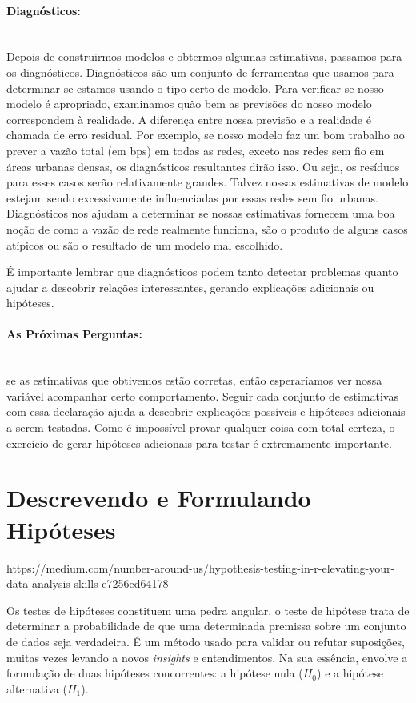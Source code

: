 \documentclass[article]{memoir}
\begin{document}
\paragraph*{Diagnósticos:}\mbox{}\\
Depois de construirmos modelos e obtermos algumas estimativas, passamos para os diagnósticos. Diagnósticos são um conjunto de ferramentas que usamos para determinar se estamos usando o tipo certo de modelo. Para verificar se nosso modelo é apropriado, examinamos quão bem as previsões do nosso modelo correspondem à realidade. A diferença entre nossa previsão e a realidade é chamada de erro residual. Por exemplo, se nosso modelo faz um bom trabalho ao prever a vazão total (em bps) em todas as redes, exceto nas redes sem fio em áreas urbanas densas, os diagnósticos resultantes dirão isso. Ou seja, os resíduos para esses casos serão relativamente grandes. Talvez nossas estimativas de modelo estejam sendo excessivamente influenciadas por essas redes sem fio urbanas. Diagnósticos nos ajudam a determinar se nossas estimativas fornecem uma boa noção de como a vazão de rede realmente funciona, são o produto de alguns casos atípicos ou são o resultado de um modelo mal escolhido.

É importante lembrar que diagnósticos podem tanto detectar problemas quanto ajudar a descobrir relações interessantes, gerando explicações adicionais ou hipóteses. 

\paragraph*{As Próximas Perguntas:}\mbox{}\\
 se as estimativas que obtivemos estão corretas, então esperaríamos ver nossa variável acompanhar certo comportamento. Seguir cada conjunto de estimativas com essa declaração ajuda a descobrir explicações possíveis e hipóteses adicionais a serem testadas. Como é impossível provar qualquer coisa com total certeza, o exercício de gerar hipóteses adicionais para testar é extremamente importante. 

\section{Descrevendo e Formulando Hipóteses}
https://medium.com/number-around-us/hypothesis-testing-in-r-elevating-your-data-analysis-skills-e7256ed64178

Os testes de hipóteses constituem uma pedra angular, o teste de hipótese trata de determinar a probabilidade de que uma determinada premissa sobre um conjunto de dados seja verdadeira. É um método usado para validar ou refutar suposições, muitas vezes levando a novos \textit{insights} e entendimentos. Na sua essência, envolve a formulação de duas hipóteses concorrentes: a hipótese nula ($H_0$) e a hipótese alternativa ($H_1$).
\end{document}
